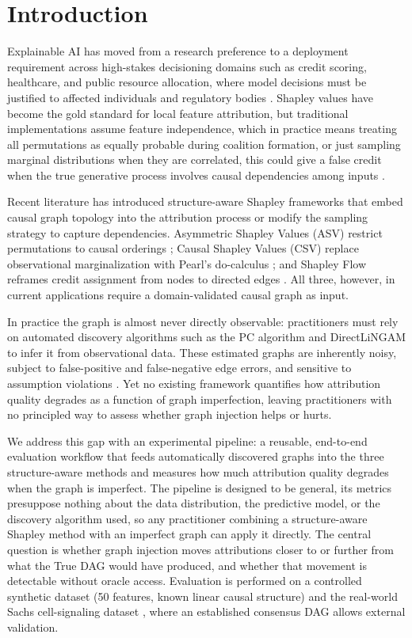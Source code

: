 \documentclass[12pt,letterpaper,twocolumn]{article}
\begin{document}
\section{Introduction}
\label{sec:intro}

Explainable AI has moved from a research preference to a deployment requirement across
high-stakes decisioning domains such as credit scoring, healthcare, and public resource allocation,
where model decisions must be justified to affected individuals and regulatory bodies
\citep{Baron2023}. Shapley values have become the gold standard for local feature
attribution, but traditional implementations assume feature independence, which in practice means treating all
permutations as equally probable during coalition formation, or just sampling marginal distributions when they are correlated, 
this could give a false credit when the true generative process involves causal dependencies among
inputs \citep{Lundberg2017, Heskes2020}.

Recent literature has introduced structure-aware Shapley frameworks that embed causal
graph topology into the attribution process or modify the sampling strategy to capture dependencies.
Asymmetric Shapley Values (ASV) restrict permutations to causal orderings \citep{Frye2021};
Causal Shapley Values (CSV) replace observational marginalization with Pearl's do-calculus \citep{Heskes2020};
and Shapley Flow reframes credit assignment from nodes to directed edges \citep{Wang2021}.
All three, however, in current applications require a domain-validated causal graph as input.

In practice the graph is almost never directly observable: practitioners must rely on
automated discovery algorithms such as the PC algorithm \citep{Spirtes2000} and
DirectLiNGAM \citep{Shimizu2011} to infer it from observational data. These estimated
graphs are inherently noisy, subject to false-positive and false-negative edge errors,
and sensitive to assumption violations \citep{Glymour2019}. Yet no existing framework
quantifies how attribution quality degrades as a function of graph imperfection, leaving
practitioners with no principled way to assess whether graph injection helps or hurts.

We address this gap with an experimental pipeline: a reusable, end-to-end evaluation
workflow that feeds automatically discovered graphs into the three structure-aware methods
and measures how much attribution quality degrades when the graph is imperfect.
The pipeline is designed to be general, its metrics presuppose nothing about the data
distribution, the predictive model, or the discovery algorithm used, so any practitioner
combining a structure-aware Shapley method with an imperfect graph can apply it directly.
The central question is whether graph injection moves attributions closer to or further
from what the True DAG would have produced, and whether that movement is detectable
without oracle access. Evaluation is performed on a controlled synthetic dataset
(50 features, known linear causal structure) and the real-world Sachs cell-signaling
dataset \citep{Sachs2005}, where an established consensus DAG allows external
validation.
\end{document}

